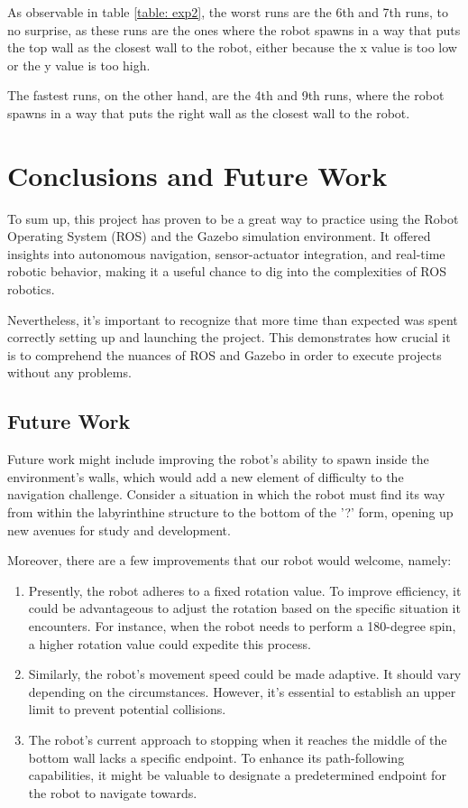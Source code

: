 \documentclass[conference]{IEEEtran}
\begin{document}
As observable in table \ref{table: exp2}, the worst runs are the 6th and 7th runs, to no surprise, as these runs are the ones where the robot spawns in a way that puts the top wall as the closest wall to the robot,
either because the x value is too low or the y value is too high.

The fastest runs, on the other hand, are the 4th and 9th runs, where the robot spawns in a way that puts the right wall as the closest wall to the robot.

\section{Conclusions and Future Work}

To sum up, this project has proven to be a great way to practice using the Robot Operating System (ROS) and the Gazebo simulation environment. It offered insights into autonomous navigation, sensor-actuator integration, and real-time robotic behavior, making it a useful chance to dig into the complexities of ROS robotics.

Nevertheless, it's important to recognize that more time than expected was spent correctly setting up and launching the project. This demonstrates how crucial it is to comprehend the nuances of ROS and Gazebo in order to execute projects without any problems. 

\subsection{Future Work}
Future work might include improving the robot's ability to spawn inside the environment's walls, which would add a new element of difficulty to the navigation challenge. Consider a situation in which the robot must find its way from within the labyrinthine structure to the bottom of the '?' form, opening up new avenues for study and development.

Moreover, there are a few improvements that our robot would welcome, namely:
\begin{enumerate}
    \item Presently, the robot adheres to a fixed rotation value. To improve efficiency, it could be advantageous to adjust the rotation based on the specific situation it encounters. For instance, when the robot needs to perform a 180-degree spin, a higher rotation value could expedite this process.
    \item Similarly, the robot's movement speed could be made adaptive. It should vary depending on the circumstances. However, it's essential to establish an upper limit to prevent potential collisions.
    \item The robot's current approach to stopping when it reaches the middle of the bottom wall lacks a specific endpoint. To enhance its path-following capabilities, it might be valuable to designate a predetermined endpoint for the robot to navigate towards. 
\end{enumerate}
\end{document}

